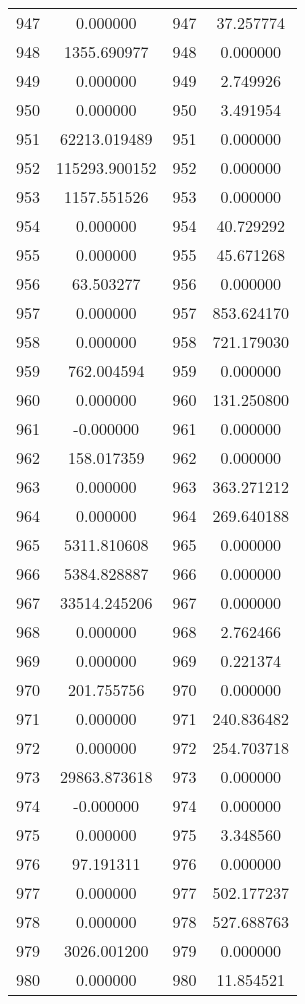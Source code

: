 \documentclass[12pt]{article}
\begin{document}
\begin{longtable}{@{}cccc@{}}
947 & 0.000000 & 947 & 37.257774 \\
948 & 1355.690977 & 948 & 0.000000 \\
949 & 0.000000 & 949 & 2.749926 \\
950 & 0.000000 & 950 & 3.491954 \\
951 & 62213.019489 & 951 & 0.000000 \\
952 & 115293.900152 & 952 & 0.000000 \\
953 & 1157.551526 & 953 & 0.000000 \\
954 & 0.000000 & 954 & 40.729292 \\
955 & 0.000000 & 955 & 45.671268 \\
956 & 63.503277 & 956 & 0.000000 \\
957 & 0.000000 & 957 & 853.624170 \\
958 & 0.000000 & 958 & 721.179030 \\
959 & 762.004594 & 959 & 0.000000 \\
960 & 0.000000 & 960 & 131.250800 \\
961 & -0.000000 & 961 & 0.000000 \\
962 & 158.017359 & 962 & 0.000000 \\
963 & 0.000000 & 963 & 363.271212 \\
964 & 0.000000 & 964 & 269.640188 \\
965 & 5311.810608 & 965 & 0.000000 \\
966 & 5384.828887 & 966 & 0.000000 \\
967 & 33514.245206 & 967 & 0.000000 \\
968 & 0.000000 & 968 & 2.762466 \\
969 & 0.000000 & 969 & 0.221374 \\
970 & 201.755756 & 970 & 0.000000 \\
971 & 0.000000 & 971 & 240.836482 \\
972 & 0.000000 & 972 & 254.703718 \\
973 & 29863.873618 & 973 & 0.000000 \\
974 & -0.000000 & 974 & 0.000000 \\
975 & 0.000000 & 975 & 3.348560 \\
976 & 97.191311 & 976 & 0.000000 \\
977 & 0.000000 & 977 & 502.177237 \\
978 & 0.000000 & 978 & 527.688763 \\
979 & 3026.001200 & 979 & 0.000000 \\
980 & 0.000000 & 980 & 11.854521 \\

\end{longtable}
\end{document}
